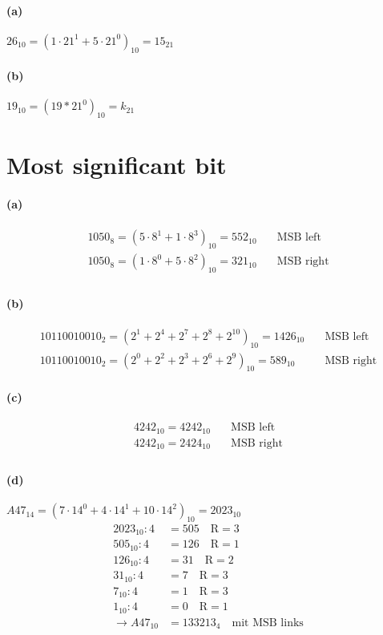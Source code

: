 \documentclass[a4paper]{article}
\begin{document}
\paragraph{(a)}
$26_{10} = (1\cdot21^1+5\cdot21^0)_{10} = 15_{21}$
\paragraph{(b)}
$19_{10} = (19*21^0)_{10} = k_{21}$


\section{Most significant bit}
\paragraph{(a)}
\begin{align*}
	1050_8 = (5\cdot8^1 + 1\cdot8^3)_{10} = 552_{10} \quad &\text{MSB left}\\
	1050_8 = (1\cdot8^0 + 5\cdot8^2)_{10} = 321_{10} \quad &\text{MSB right}\\
\end{align*}

\paragraph{(b)}
\begin{align*}
	10110010010_2 = (2^1+2^4+2^7+2^8+2^{10})_{10} = 1426_{10} \quad &\text{MSB left}\\
	10110010010_2 = (2^0+2^2+2^3+2^6+2^9)_{10} = 589_{10} \quad &\text{MSB right}
\end{align*}

\paragraph{(c)}
\begin{align*}
	4242_{10} = 4242_{10} \quad &\text{MSB left}\\
	4242_{10} = 2424_{10} \quad &\text{MSB right}\\
\end{align*}

\paragraph{(d)}
$A47_{14} = (7\cdot14^0+4\cdot14^1+10\cdot14^2)_{10}=2023_{10}$
\begin{align*}
	2023_{10} : 4 &= 505 \quad \text{R}=3\\
	505_{10} : 4 &= 126 \quad \text{R}=1\\
	126_{10} : 4 &= 31 \quad \text{R}=2\\
	31_{10} : 4 &= 7 \quad \text{R}=3\\
	7_{10} : 4 &=1 \quad \text{R}=3\\
	1_{10} : 4 &=0 \quad \text{R}=1\\
	\rightarrow A47_{10} &= 133213_4 \quad \text{mit MSB links}\\
\end{align*}
\end{document}
